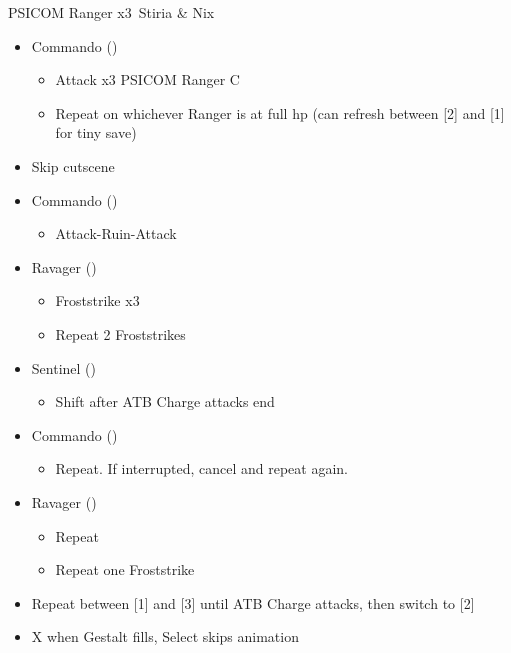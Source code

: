 \begin{paracol}{2}

	\switchcolumn*


	\renewcommand{\first}{[1] Commando (\com)}
	\renewcommand{\second}{[2] Sentinel (\sen)}
	\renewcommand{\third}{[3] Ravager (\rav)}

	\begin{battle}{PSICOM Ranger x3\, Stiria \& Nix}
		\begin{itemize}
			\item \first
			      \begin{itemize}
				      \item Attack x3 PSICOM Ranger C
				      \item Repeat on whichever Ranger is at full hp (can refresh between [2] and [1] for tiny save)
			      \end{itemize}
			\item Skip cutscene
			\item \first
			      \begin{itemize}
				      \item Attack-Ruin-Attack
			      \end{itemize}
			\item \third
			      \begin{itemize}
				      \item Froststrike x3
				      \item Repeat 2 Froststrikes
			      \end{itemize}
			\item \second
			      \begin{itemize}
				      \item Shift after ATB Charge attacks end
			      \end{itemize}
			\item \first
			      \begin{itemize}
				      \item Repeat. If interrupted, cancel and repeat again.
			      \end{itemize}
			\item \third
			      \begin{itemize}
				      \item Repeat
				      \item Repeat one Froststrike
			      \end{itemize}
			\item Repeat between [1] and [3] until ATB Charge attacks, then switch to [2]
			\item X when Gestalt fills, Select skips animation
		\end{itemize}
		 
	\end{battle}


\end{paracol}
